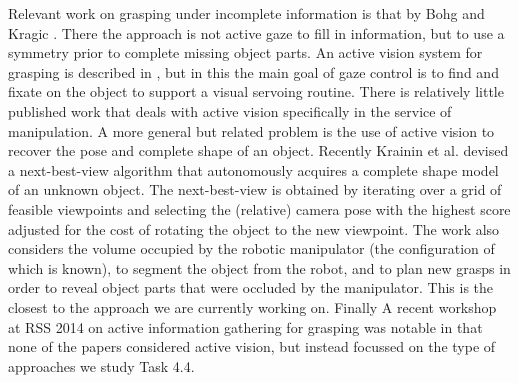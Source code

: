 \documentclass[a4paper,11pt,pdf]{pacmanreport}
\begin{document}
Relevant work on grasping under incomplete information is that by Bohg and Kragic \cite{bohg:icra11}. There the approach is not active gaze to fill in information, but to use a symmetry prior to complete missing object parts. An active vision system for grasping is described in \cite{gratal:irosws10}, but in this the main goal of gaze control is to find and fixate on the object to support a visual servoing routine. There is relatively little published work that deals with active vision specifically in the service of manipulation. A more general but related problem is the use of active vision to recover the pose and complete shape of an object. Recently Krainin et al. \cite{Kra11Aut} devised a next-best-view algorithm that autonomously acquires a complete shape model of an unknown object. The next-best-view is obtained by iterating over a grid of feasible viewpoints and selecting the (relative) camera pose with the highest score adjusted for the cost of rotating the object to the new viewpoint. The work also considers the volume occupied by the robotic manipulator (the configuration of which is known), to segment the object from the robot, and to plan new grasps in order to reveal object parts that were occluded by the manipulator. This is the closest to the approach we are currently working on. Finally A recent workshop at RSS 2014 on active information gathering for grasping was notable in that none of the papers considered active vision, but instead focussed on the type of approaches we study Task 4.4.



\end{document}
